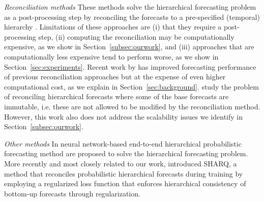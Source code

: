 \documentclass[preprint, 3p, times, twocolumn]{elsarticle}
\begin{document}
\textit{Reconciliation methods} These methods solve the hierarchical forecasting problem as a post-processing step by reconciling the forecasts to a pre-specified (temporal) hierarchy \cite{hyndman_optimal_2011, hyndman_fast_2016, taieb_coherent_2017, bentaieb_regularized_2019, wickramasuriya_optimal_2019, panagiotelis_forecast_2021}. Limitations of these approaches are (i) that they require a post-processing step, (ii) computing the reconciliation may be computationally expensive, as we show in Section~\ref{subsec:ourwork}, and (iii) approaches that are computationally less expensive tend to perform worse, as we show in Section~\ref{sec:experiments}. Recent work by \citet{taieb_sparse_2017, bentaieb_regularized_2019} has improved forecasting performance of previous reconciliation approaches but at the expense of even higher computational cost, as we explain in Section~\ref{sec:background}. \citet{zhang_optimal_2023} study the problem of reconciling hierarchical forecasts where some of the base forecasts are immutable, i.e. these are not allowed to be modified by the reconciliation method. However, this work also does not address the scalability issues we identify in Section~\ref{subsec:ourwork}.

\textit{Other methods} In \cite{rangapuram_endtoend_2021,rangapuram_coherent_2023} neural network-based end-to-end hierarchical probabilistic forecasting method are proposed to solve the hierarchical forecasting problem. More recently and most closely related to our work, \citet{han_simultaneously_2021} introduced SHARQ, a method that reconciles probabilistic hierarchical forecasts during training by employing a regularized loss function that enforces hierarchical consistency of bottom-up forecasts through regularization.
\end{document}
